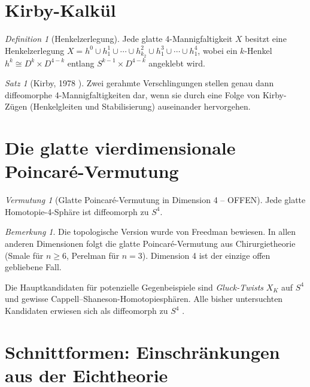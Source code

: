 \documentclass[12pt,a4paper]{amsart}
\theoremstyle{definition}
\theoremstyle{remark}
\newtheorem{satz}[theorem]{Satz}
\newtheorem{vermutung}[theorem]{Vermutung}
\newtheorem{bemerkung}[theorem]{Bemerkung}
\newtheorem{definition_de}[theorem]{Definition}
\begin{document}
\section{Kirby-Kalkül}

\begin{definition_de}[Henkelzerlegung]
Jede glatte 4-Mannigfaltigkeit $X$ besitzt eine Henkelzerlegung
$X = h^0 \cup h^1_1 \cup \cdots \cup h^2_{k_2} \cup h^3_1 \cup \cdots \cup h^4_1$,
wobei ein $k$-Henkel $h^k \cong D^k \times D^{4-k}$ entlang
$S^{k-1} \times D^{4-k}$ angeklebt wird.
\end{definition_de}

\begin{satz}[Kirby, 1978 \cite{Kirby1978}]
Zwei gerahmte Verschlingungen stellen genau dann diffeomorphe 4-Mannigfaltigkeiten dar,
wenn sie durch eine Folge von Kirby-Zügen (Henkelgleiten und Stabilisierung)
auseinander hervorgehen.
\end{satz}

\section{Die glatte vierdimensionale Poincaré-Vermutung}

\begin{vermutung}[Glatte Poincaré-Vermutung in Dimension 4 -- OFFEN]
\label{verm:s4pc}
Jede glatte Homotopie-4-Sphäre ist diffeomorph zu $S^4$.
\end{vermutung}

\begin{bemerkung}
Die topologische Version wurde von Freedman bewiesen.  In allen anderen
Dimensionen folgt die glatte Poincaré-Vermutung aus Chirurgietheorie
(Smale für $n \ge 6$, Perelman für $n = 3$).  Dimension 4 ist der einzige
offen gebliebene Fall.
\end{bemerkung}

Die Hauptkandidaten für potenzielle Gegenbeispiele sind \emph{Gluck-Twists}
$X_K$ auf $S^4$ und gewisse Cappell--Shaneson-Homotopiesphären.
Alle bisher untersuchten Kandidaten erwiesen sich als diffeomorph zu $S^4$
\cite{AkbulutKirby1979}.

\section{Schnittformen: Einschränkungen aus der Eichtheorie}
\end{document}
